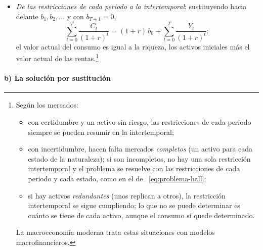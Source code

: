 \documentclass[11pt]{article}
\begin{document}
\begin{itemize}
\item \emph{De las restricciones de cada periodo a la intertemporal}: sustituyendo hacia delante $b_1,b_2,\dots$ y con $b_{T+1}=0$,
  \begin{equation}
  \sum_{t=0}^{T}\frac{C_t}{(1+r)^t}=(1+r)\,b_0+\sum_{t=0}^{T}\frac{Y_t}{(1+r)^t}:\label{eq:restriccion-intertemporal}
  \end{equation}
  el valor actual del consumo es igual a la riqueza, los activos iniciales más el valor actual de las rentas.\footnote{Según los mercados:
\begin{itemize}
\item con certidumbre y un activo sin riesgo, las restricciones de cada periodo siempre se pueden resumir en la intertemporal;
\item con incertidumbre, hacen falta mercados \emph{completos} (un activo para cada estado de la naturaleza); si son incompletos, no hay una sola restricción intertemporal y el problema se resuelve con las restricciones de cada periodo y cada estado, como en el de ~\eqref{eq:problema-hall};
\item si hay activos \emph{redundantes} (unos replican a otros), la restricción intertemporal se sigue cumpliendo; lo que no se puede determinar es cuánto se tiene de cada activo, aunque el consumo sí quede determinado.
\end{itemize}
La macroeconomía moderna trata estas situaciones con modelos macrofinancieros.}
\end{itemize}

\paragraph{b) La solución por sustitución}
\end{document}
